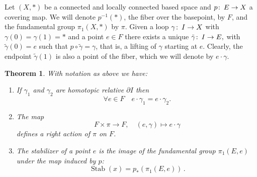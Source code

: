 \documentclass[12pt]{article}
\newtheorem{thm}{Theorem}
\theoremstyle{definition}
\theoremstyle{remark}
\numberwithin{equation}{subsection}
\newcommand{\Gg}{\gamma}
\def\co{\colon\thinspace}
\begin{document}
Let $(X,*)$ be a connected and locally connected based space and $p\co E \to X$ a covering map. We will denote $p^{-1}(*)$, the fiber over the basepoint, by $F$, and the fundamental
group $\pi_1(X,*)$ by $\pi$. Given a loop
$\Gg\co I \to X$ with $\Gg(0)=\Gg(1)=*$ and a point $e\in F$ there exists a
unique $\tilde\Gg\co I\to E,$ with $ \tilde\Gg(0)=e$ such that $p\circ\tilde\Gg=\Gg$,
that is, a lifting of $\Gg$ starting at $e$. Clearly, the endpoint
$\tilde\Gg(1)$ is also a point of the fiber, which we will denote by
$e\cdot\Gg$.

\begin{thm}
  With  notation as above we have:
  \begin{enumerate}
  \item If $\Gg_1$ and $\Gg_2$ are homotopic relative $\partial I$ then
$$\forall e\in F \quad e\cdot\Gg_1=e\cdot\Gg_2.$$
\item The map 
$$ F\times\pi\to F,\quad (e,\Gg)\mapsto e\cdot\Gg$$
defines a right action of $\pi$ on $F$.
\item The stabilizer of a point $e$ is the image of the fundamental group
  $\pi_1(E,e)$ under the map induced by $p$:
$$ \operatorname{Stab}(x) = p_{*}\left(\pi_1(E,e)\right)\,.$$
 
  \end{enumerate}
\end{thm}
\end{document}
